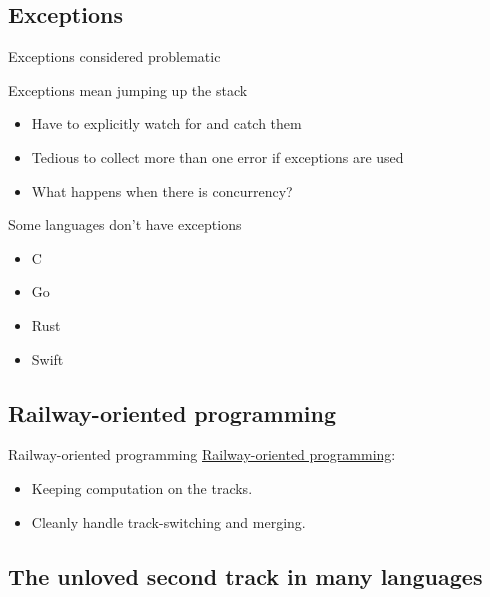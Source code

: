 \subsection{Exceptions}

\begin{frame}{Exceptions considered problematic}
  \begin{alertblock}{Exceptions mean jumping up the stack}
    \begin{itemize}
    \item Have to explicitly watch for and catch them
    \item Tedious to collect more than one error if exceptions are
      used
    \item What happens when there is concurrency?
    \end{itemize}
  \end{alertblock}

  \begin{block}{Some languages don't have exceptions}
    \begin{itemize}
    \item C
    \item Go
    \item Rust
    \item Swift
    \end{itemize}
  \end{block}
\end{frame}

\subsection{Railway-oriented programming}

\begin{frame}{Railway-oriented programming}
  \href{http://fsharpforfunandprofit.com/posts/recipe-part2/}{Railway-oriented
    programming}:
  \begin{itemize}
  \item Keeping computation on the tracks.
  \item Cleanly handle track-switching and merging.
  \end{itemize}
\end{frame}

\subsection{The unloved second track in many languages}

